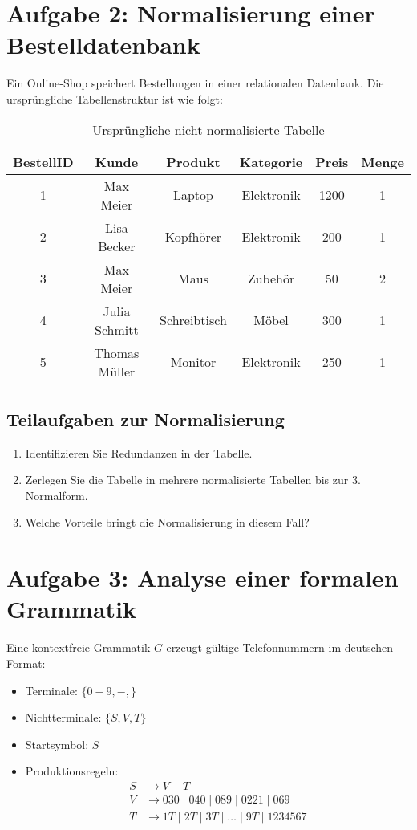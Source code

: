 \documentclass[a4paper,12pt]{article}
\begin{document}
	\section*{Aufgabe 2: Normalisierung einer Bestelldatenbank}
	
	Ein Online-Shop speichert Bestellungen in einer relationalen Datenbank. Die ursprüngliche Tabellenstruktur ist wie folgt:
	
	\begin{table}[h]
		\centering
		\caption{Ursprüngliche nicht normalisierte Tabelle}
		\begin{tabular}{|c|c|c|c|c|c|}
			\hline
			BestellID & Kunde & Produkt & Kategorie & Preis & Menge \\
			\hline
			1 & Max Meier & Laptop & Elektronik & 1200 & 1 \\
			2 & Lisa Becker & Kopfhörer & Elektronik & 200 & 1 \\
			3 & Max Meier & Maus & Zubehör & 50 & 2 \\
			4 & Julia Schmitt & Schreibtisch & Möbel & 300 & 1 \\
			5 & Thomas Müller & Monitor & Elektronik & 250 & 1 \\
			\hline
		\end{tabular}
	\end{table}
	
	\subsection*{Teilaufgaben zur Normalisierung}
	\begin{enumerate}
		\item Identifizieren Sie Redundanzen in der Tabelle.
		\item Zerlegen Sie die Tabelle in mehrere normalisierte Tabellen bis zur 3. Normalform.
		\item Welche Vorteile bringt die Normalisierung in diesem Fall?
	\end{enumerate}
	
	\section*{Aufgabe 3: Analyse einer formalen Grammatik}
	
	Eine kontextfreie Grammatik \( G \) erzeugt gültige Telefonnummern im deutschen Format:
	\begin{itemize}
		\item Terminale: \( \{0-9, -, \} \)
		\item Nichtterminale: \( \{S, V, T\} \)
		\item Startsymbol: \( S \)
		\item Produktionsregeln:
		\begin{align*}
			S &\to V - T \\
			V &\to 030 \mid 040 \mid 089 \mid 0221 \mid 069 \\
			T &\to 1T \mid 2T \mid 3T \mid \dots \mid 9T \mid 1234567
		\end{align*}
	\end{itemize}
	
\end{document}
